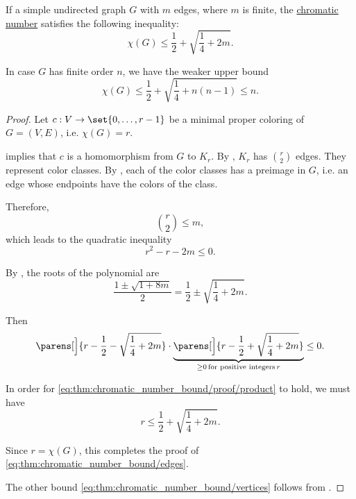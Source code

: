 \begin{proposition}\label{thm:chromatic_number_bound}
  If a simple undirected graph \( G \) with \( m \) edges, where \( m \) is finite, the \hyperref[def:chromatic_number]{chromatic number} satisfies the following inequality:
  \begin{equation}\label{eq:thm:chromatic_number_bound/edges}
    \chi(G) \leq \frac 1 2 + \sqrt{ \frac 1 4 + 2m }.
  \end{equation}

  In case \( G \) has finite order \( n \), we have the weaker upper bound
  \begin{equation}\label{eq:thm:chromatic_number_bound/vertices}
    \chi(G) \leq \frac 1 2 + \sqrt{ \frac 1 4 + n(n - 1) } \leq n.
  \end{equation}
\end{proposition}
\begin{proof}
  Let \( c: V \to \set{ 0, \ldots, r - 1 } \) be a minimal proper coloring of \( G = (V, E) \), i.e. \( \chi(G) = r \).

   implies that \( c \) is a homomorphism from \( G \) to \( K_r \). By , \( K_r \) has \( \binom r 2 \) edges. They represent color classes. By , each of the color classes has a preimage in \( G \), i.e. an edge whose endpoints have the colors of the class.

  Therefore,
  \begin{equation*}
    \binom r 2 \leq m,
  \end{equation*}
  which leads to the quadratic inequality
  \begin{equation*}
    r^2 - r - 2m \leq 0.
  \end{equation*}

  By , the roots of the polynomial are
  \begin{equation*}
    \frac { 1 \pm \sqrt{ 1 + 8m } } 2 = \frac 1 2 \pm \sqrt{ \frac 1 4 + 2m }.
  \end{equation*}

  Then
  \begin{equation}\label{eq:thm:chromatic_number_bound/proof/product}
    \parens[\Big]{ r - \frac 1 2 - \sqrt{ \frac 1 4 + 2m } } \cdot \underbrace{\parens[\Big]{ r - \frac 1 2 + \sqrt{ \frac 1 4 + 2m } }}_{\geq 0 \T*{for positive integers} r} \leq 0.
  \end{equation}

  In order for \eqref{eq:thm:chromatic_number_bound/proof/product} to hold, we must have
  \begin{equation*}
    r \leq \frac 1 2 + \sqrt{ \frac 1 4 + 2m }.
  \end{equation*}

  Since \( r = \chi(G) \), this completes the proof of \eqref{eq:thm:chromatic_number_bound/edges}.

  The other bound \eqref{eq:thm:chromatic_number_bound/vertices} follows from .
\end{proof}

